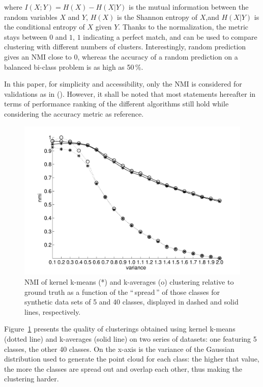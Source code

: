 \documentclass[10pt,journal,compsoc]{IEEEtran}
\newcommand{\gl}[1]{``\,#1\,''} %
\begin{document}
where $I(X;Y)=H(X)−H(X|Y)$ is the mutual information between the random variables $X$ and $Y$, $H(X)$ is the Shannon entropy of $X$,and $H(X|Y)$ is the conditional entropy of $X$ given $Y$. Thanks to the normalization, the metric stays between $0$ and $1$, $1$ indicating a perfect match, and can be used to compare clustering with different numbers of clusters. Interestingly, random prediction gives an NMI close to $0$, whereas the accuracy of a random prediction on a balanced bi-class problem is as high as 50\,\%.

In this paper, for simplicity and accessibility, only the NMI is considered for validations as in (\cite{Kulis2008}). However, it shall be noted that most statements hereafter in terms of performance ranking of the different algorithms still hold while considering the accuracy metric as reference.

\begin{figure}
\center
\includegraphics[width=\columnwidth]{figures/synthetic.pdf} 
\caption{NMI of kernel k-means (*) and k-averages (o) clustering relative to ground truth as a function of the \gl{spread} of those classes for synthetic data sets of 5 and 40 classes, displayed in dashed and solid lines, respectively.}
\label{fig:synth_perf}
\end{figure}

Figure~\ref{fig:synth_perf} presents the quality of clusterings obtained using kernel k-means (dotted line) and k-averages (solid line) on two series of datasets: one featuring 5 classes, the other 40 classes. On the x-axis is the variance of the Gaussian distribution used to generate the point cloud for each class: the higher that value, the more the classes are spread out and overlap each other, thus making the clustering harder.
\end{document}

